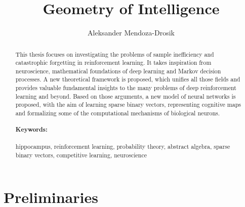 \documentclass[oneside,english,logo]{amuthesis}
\author{Aleksander Mendoza-Drosik}
\title{Geometry of Intelligence}
\begin{document}
\maketitle


\lstset{
	basicstyle=\ttfamily,
	mathescape
}



\begin{abstract}
	This thesis focuses on investigating the problems of sample inefficiency and catastrophic forgetting in reinforcement learning. It takes inspiration from neuroscience, mathematical foundations of deep learning and Markov decision processes. A new theoretical framework is proposed, which unifies all those fields and provides valuable fundamental insights to the many problems of deep reinforcement learning and beyond. Based on those arguments, a new model of neural networks is proposed, with the aim of learning sparse binary vectors, representing cognitive maps and formalizing some of the computational mechanisms of biological neurons.
	
	\paragraph{Keywords:} hippocampus, reinforcement learning, probability theory, abstract algebra, sparse binary vectors, competitive learning, neuroscience
\end{abstract}

\tableofcontents
\chapter{Preliminaries}
\end{document}
